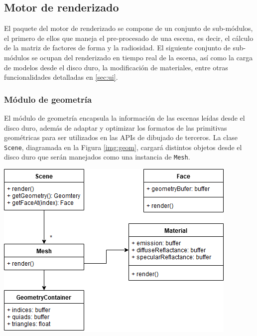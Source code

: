 \subsection{Motor de renderizado}
\label{sec:engine}

El paquete del motor de renderizado se compone de un conjunto de sub-módulos, el primero de ellos que maneja el pre-procesado de una escena, es decir, el cálculo de la matriz de factores de forma y la radiosidad. El siguiente conjunto de sub-módulos se ocupan del renderizado en tiempo real de la escena, así como la carga de modelos desde el disco duro, la modificación de materiales, entre otras funcionalidades detalladas en \ref{sec:ui}.

\subsubsection{Módulo de geometría}

El módulo de geometría encapsula la información de las escenas leídas desde el disco duro, además de adaptar y optimizar los formatos de las primitivas geométricas para ser utilizados en las APIs de dibujado de terceros. La clase \verb|Scene|, diagramada en la Figura \ref{img:geom}, cargará distintos objetos desde el disco duro que serán manejados como una instancia de \verb|Mesh|.


\vspace{5mm}
\begin{minipage}[h]{0.7\linewidth}
	\centering
	\includegraphics[width=\linewidth]{assets/geometry}
	\label{img:geom}
\end{minipage}

